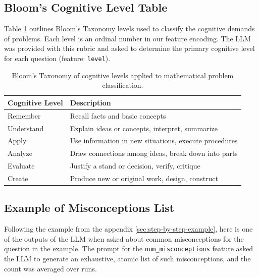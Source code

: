 \documentclass[
    a4paper, %
    10pt, %
    twoside, %
]{LTJournalArticle}
\begin{document}
\subsection{Bloom's Cognitive Level Table}
Table \ref{tab:blooms-taxonomy} outlines Bloom's Taxonomy levels used to classify the cognitive demands of problems. Each level is an ordinal number in our feature encoding. The LLM was provided with this rubric and asked to determine the primary cognitive level for each question (feature: \texttt{level}).
\begin{table}[H]
    \centering
    \begin{tabular}{p{}p{}}
        \hline
        \textbf{Cognitive Level} & \textbf{Description} \\
        \hline
        Remember & Recall facts and basic concepts \\
        Understand & Explain ideas or concepts, interpret, summarize \\
        Apply & Use information in new situations, execute procedures \\
        Analyze & Draw connections among ideas, break down into parts \\
        Evaluate & Justify a stand or decision, verify, critique \\
        Create & Produce new or original work, design, construct \\
        \hline
    \end{tabular}
    \caption{Bloom's Taxonomy of cognitive levels applied to mathematical problem classification.}
    \label{tab:blooms-taxonomy}
\end{table}

\subsection{Example of Misconceptions List}
Following the example from the appendix \ref{sec:step-by-step-example}, here is one of the outputs of the LLM when asked about common misconceptions for the question in the example. The prompt for the \texttt{num\_misconceptions} feature asked the LLM to generate an exhaustive, atomic list of such misconceptions, and the count was averaged over runs.
\end{document}
